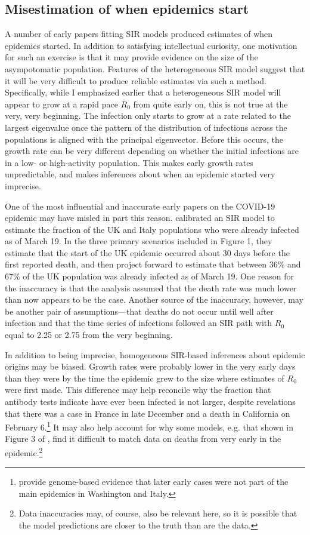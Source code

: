 \documentclass[11pt]{article}
\begin{document}
\subsection{Misestimation of when epidemics start}

A number of early papers fitting SIR models produced estimates of when epidemics started. In addition to satisfying intellectual curiosity, 
one motivation for such an exercise is that it may provide evidence on the size of the asympotomatic population. Features of
the heterogeneous SIR model suggest that it will be very difficult to produce reliable estimates via such a method.
Specifically, while I emphasized earlier that a heterogeneous SIR model will appear to grow at a rapid pace $\overline{R}_0$ from quite
early on, this is not true at the very, very beginning. The infection only starts to grow at a rate related to the largest eigenvalue 
once the pattern of the distribution of infections across the populations is aligned with the principal eigenvector. Before this occurs,
the growth rate can be very different depending on whether the initial infections are in a low- or high-activity population. This makes early
growth rates unpredictable, and makes inferences about when an epidemic started very imprecise. 

One of the most influential and inaccurate early papers on the COVID-19 epidemic may have misled in part this reason. 
\citet{lourencco2020fundamental} calibrated an SIR model to estimate the fraction of the UK and Italy populations who were already infected as
of March 19. In the three primary scenarios included in Figure 1, they estimate that the start of the UK epidemic occurred about 30 days 
before the first reported death,  and then project forward to estimate that between 36\% and 67\% of the UK population was already infected 
as of March 19.  One reason for the inaccuracy is that the analysis assumed that the death rate was much lower than now appears to be the 
case. Another source of the inaccuracy, however, may be another pair of assumptions---that deaths do not occur until well after 
infection and  that the time series of infections followed an SIR path with $R_0$ equal to 2.25 or 2.75 from the very beginning. 

In addition to being imprecise, homogeneous SIR-based inferences about epidemic origins may be biased. 
Growth rates were probably lower in the very early days than they were by the time the epidemic grew to the size where 
estimates of $R_0$ were first made. This difference may help reconcile why the fraction that antibody tests indicate have ever
been infected is not larger, despite revelations that there was a case in France in late December and a death in California
on February 6.\footnote{\citet{worobey2020emergence} 
provide genome-based evidence that later early cases were not part of the main epidemics in 
Washington and Italy.} It may also help account for why some models, e.g. that shown in Figure 3 of \citet{baqaee2020reopening}, find it difficult to 
match data on deaths from very early in the epidemic.\footnote{Data inaccuracies may, of course, also be relevant here, so it is possible that the model predictions are closer to the truth than are the data.}
\end{document}
